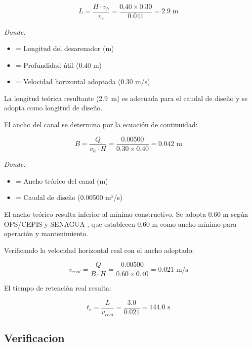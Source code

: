 \documentclass[12pt,a4paper]{article}
\begin{document}
\begin{equation}
L = \frac{H \cdot v_h}{v_s} = \frac{0.40 \times 0.30}{0.041} = 2.9 \text{ m}
\end{equation}

\textit{Donde:}
\begin{itemize}[noitemsep,leftmargin=2em]
    \item[$L$] = Longitud del desarenador (m)
    \item[$H$] = Profundidad \'util (0.40 m)
    \item[$v_h$] = Velocidad horizontal adoptada (0.30 m/s)
\end{itemize}

La longitud te\'orica resultante (2.9~m) es adecuada para el caudal de dise\~no y se adopta como longitud de dise\~no.

El ancho del canal se determina por la ecuaci\'on de continuidad:

\begin{equation}
B = \frac{Q}{v_h \cdot H} = \frac{0.00500}{0.30 \times 0.40} = 0.042 \text{ m}
\end{equation}

\textit{Donde:}
\begin{itemize}[noitemsep,leftmargin=2em]
    \item[$B$] = Ancho te\'orico del canal (m)
    \item[$Q$] = Caudal de dise\~no (0.00500 m³/s)
\end{itemize}

El ancho te\'orico resulta inferior al m\'inimo constructivo. Se adopta 0.60 m seg\'un OPS/CEPIS \cite{ops2005} y SENAGUA \cite{senagua2012}, que establecen 0.60 m como ancho m\'inimo para operaci\'on y mantenimiento.

Verificando la velocidad horizontal real con el ancho adoptado:

\begin{equation}
v_{real} = \frac{Q}{B \cdot H} = \frac{0.00500}{0.60 \times 0.40} = 0.021 \text{ m/s}
\end{equation}

El tiempo de retenci\'on real resulta:

\begin{equation}
t_r = \frac{L}{v_{real}} = \frac{3.0}{0.021} = 144.0 \text{ s}
\end{equation}

\subsection{Verificacion}
\end{document}

